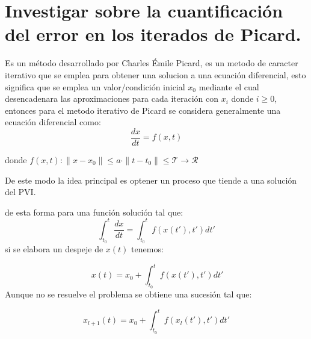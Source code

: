 \section{Investigar sobre la cuantificación del error en los iterados de Picard.}
Es un método desarrollado por Charles Émile Picard, es un metodo de caracter iterativo que se emplea para obtener una solucion a una ecuación diferencial, esto significa que se emplea un valor/condición inicial $x_0$ mediante el cual desencadenara las aproximaciones para cada iteración con $x_i$ donde $i\geq0$, entonces para el metodo iterativo de Picard se considera generalmente una ecuación diferencial como:
$$\frac{dx}{dt}=f(x,t)$$

donde $f(x,t): \|x-x_0\| \leq a\cdot \| t-t_0 \|\leq \mathcal{T}\rightarrow \mathcal{R}$

De este modo la idea principal es optener un proceso que tiende a una solución del \texttt{}{PVI}.

de esta forma para una función solución tal que:
$$\int _{t_0}^t\frac{dx}{dt}=\int _{t_0}^tf\left(x\left(t'\right),t'\right)dt'$$
si se elabora un despeje de $x(t)$
tenemos:

$$\:x\left(t\right)=x_0+\int _{t_0}^tf\left(x\left(t'\right),t'\right)dt'$$
Aunque no se resuelve el problema se obtiene una sucesión tal que:

$$x_{l+1}(t)=x_0+\int_{t_0}^t f(x_l(t'),t')dt'$$